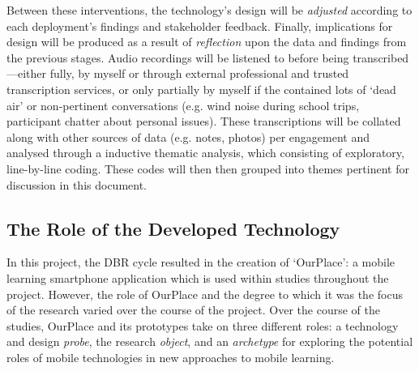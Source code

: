 Between these interventions, the technology's design will be \textit{adjusted} according to each deployment's findings and stakeholder feedback. Finally, implications for design will be produced as a result of \textit{reflection} upon the data and findings from the previous stages. Audio recordings will be listened to before being transcribed---either fully, by myself or through external professional and trusted transcription services, or only partially by myself if the contained lots of `dead air' or non-pertinent conversations (e.g. wind noise during school trips, participant chatter about personal issues). These transcriptions will be collated along with other sources of data (e.g. notes, photos) per engagement and analysed through a inductive thematic analysis, which consisting of exploratory, line-by-line coding. These codes will then then grouped into themes pertinent for discussion in this document.

\subsection{The Role of the Developed Technology}

In this project, the DBR cycle resulted in the creation of `OurPlace': a mobile learning smartphone application which is used within studies throughout the project. However, the role of OurPlace and the degree to which it was the focus of the research varied over the course of the project. Over the course of the studies, OurPlace and its prototypes take on three different roles: a technology and design \textit{probe}, the research \textit{object}, and an \textit{archetype} for exploring the potential roles of mobile technologies in new approaches to mobile learning. 

